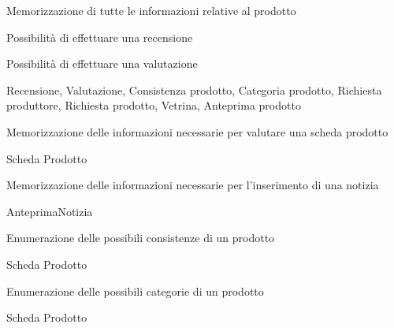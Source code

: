 
{\begin{itemWork}
	\item Memorizzazione di tutte le informazioni relative al prodotto
	\item Possibilità di effettuare una recensione
	\item Possibilità di effettuare una valutazione
\end{itemWork}}
{\begin{itemWork}
	\item Recensione, Valutazione, Consistenza prodotto, Categoria prodotto, Richiesta produttore, Richiesta prodotto, Vetrina, Anteprima prodotto
\end{itemWork}}


{\begin{itemWork}
	\item Memorizzazione delle informazioni necessarie per valutare una scheda prodotto
\end{itemWork}}
{\begin{itemWork}
	\item Scheda Prodotto
\end{itemWork}}


{\begin{itemWork}
	\item Memorizzazione delle informazioni necessarie per l'inserimento di una notizia
\end{itemWork}}
{\begin{itemWork}
	\item AnteprimaNotizia
\end{itemWork}}


{\begin{itemWork}
	\item Enumerazione delle possibili consistenze di un prodotto
\end{itemWork}}
{\begin{itemWork}
	\item Scheda Prodotto
\end{itemWork}}


{\begin{itemWork}
	\item Enumerazione delle possibili categorie di un prodotto
\end{itemWork}}
{\begin{itemWork}
	\item Scheda Prodotto
\end{itemWork}}

